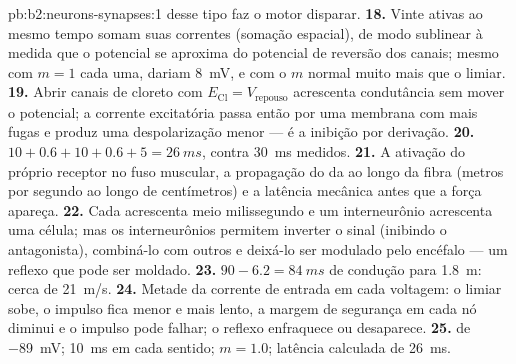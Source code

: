 \begin{solution}{pb:b2:neurons-synapses:1}
desse tipo faz o  motor disparar.
\textbf{18.} Vinte  ativas ao mesmo tempo somam suas correntes
(somação espacial), de modo sublinear à medida que o potencial se
aproxima do potencial de reversão dos canais; mesmo com $m = 1$ cada
uma, dariam \qty{8}{mV}, e com o $m$ normal muito mais que o limiar.
\textbf{19.} Abrir canais de cloreto com $E_{\mathrm{Cl}} = V_{\text{repouso}}$
acrescenta condutância sem mover o potencial; a corrente excitatória
passa então por uma membrana com mais fugas e produz uma despolarização
menor --- é a inibição por derivação.
\textbf{20.} $10 + 0.6 + 10 + 0.6 + 5 = \qty{26}{ms}$, contra
\qty{30}{ms} medidos.
\textbf{21.} A ativação do próprio receptor no fuso muscular, a
propagação do  da  ao longo da fibra
(metros por segundo ao longo de centímetros) e a latência mecânica antes
que a força apareça.
\textbf{22.} Cada  acrescenta meio milissegundo e um interneurônio
acrescenta uma célula; mas os interneurônios permitem inverter o sinal
(inibindo o antagonista), combiná-lo com outros e deixá-lo ser modulado
pelo encéfalo --- um reflexo que pode ser moldado.
\textbf{23.} $90 - 6.2 = \qty{84}{ms}$ de condução para \qty{1.8}{m}:
cerca de \qty{21}{m/s}.
\textbf{24.} Metade da corrente de entrada em cada voltagem: o limiar
sobe, o impulso fica menor e mais lento, a margem de segurança em cada
nó diminui e o impulso pode falhar; o reflexo enfraquece ou desaparece.
\textbf{25.}  de \qty{-89}{mV}; \qty{10}{ms} em cada
sentido; $m = 1.0$; latência calculada de \qty{26}{ms}.
\end{solution}
